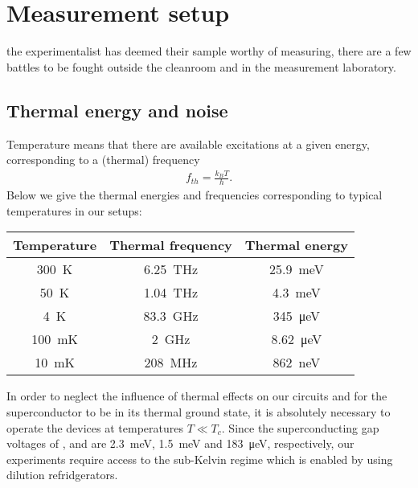\section{Measurement setup}

 the experimentalist has deemed their sample worthy of measuring, there are a few battles to be fought outside the cleanroom and in the measurement laboratory.

\subsection{Thermal energy and noise}

Temperature means that there are available excitations at a given energy, corresponding to a (thermal) frequency
\begin{align}
f_{th}=\frac{k_B T}{h}.
\end{align}
Below we give the thermal energies and frequencies corresponding to typical temperatures in our setups:
\begin{center}
\begin{tabular}{|c|c|c|}
	\hline 
	Temperature & Thermal frequency & Thermal energy \\ 
	\hline 
	\SI{300}{\kelvin} & \SI{6.25}{\tera\hertz} & \SI{25.9}{\milli\electronvolt} \\ 
	\hline 
	\SI{50}{\kelvin} & \SI{1.04}{\tera\hertz} & \SI{4.3}{\milli\electronvolt} \\ 
	\hline 
	\SI{4}{\kelvin} & \SI{83.3}{\giga\hertz} & \SI{345}{\micro\electronvolt} \\ 
	\hline 
	\SI{100}{\milli\kelvin} & \SI{2}{\giga\hertz} & \SI{8.62}{\micro\electronvolt} \\ 
	\hline 
	\SI{10}{\milli\kelvin} & \SI{208}{\mega\hertz} & \SI{862}{\nano\electronvolt} \\ 
	\hline 
\end{tabular}
\end{center}

In order to neglect the influence of thermal effects on our circuits and for the superconductor to be in its thermal ground state, it is absolutely necessary to operate the devices at temperatures $T \ll T_c$.
Since the superconducting gap voltages of ,  and  are \SI{2.3}{\milli\electronvolt}, \SI{1.5}{\milli\electronvolt} and \SI{183}{\micro\electronvolt}, respectively, our experiments require access to the sub-Kelvin regime which is enabled by using dilution refridgerators.

